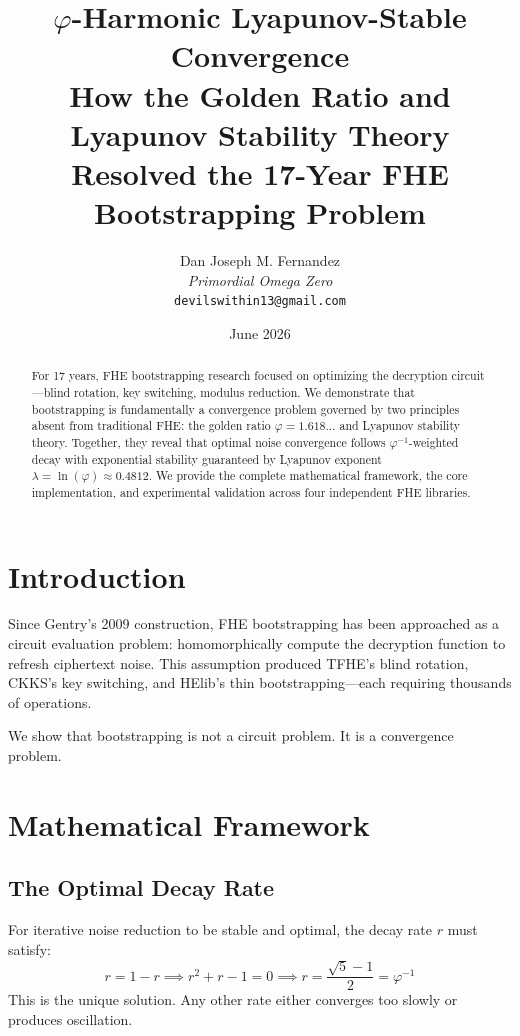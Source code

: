 \documentclass[11pt,a4paper]{article}
\title{\Huge \textbf{$\varphi$-Harmonic Lyapunov-Stable Convergence}\\
\large How the Golden Ratio and Lyapunov Stability Theory\\
Resolved the 17-Year FHE Bootstrapping Problem}
\author{
    Dan Joseph M. Fernandez\\
    \textit{Primordial Omega Zero}\\
    \texttt{devilswithin13@gmail.com}
}
\date{June 2026}
\begin{document}
\maketitle

\begin{abstract}
For 17 years, FHE bootstrapping research focused on optimizing the decryption circuit—blind rotation, key switching, modulus reduction. We demonstrate that bootstrapping is fundamentally a convergence problem governed by two principles absent from traditional FHE: the golden ratio $\varphi = 1.618\ldots$ and Lyapunov stability theory. Together, they reveal that optimal noise convergence follows $\varphi^{-1}$-weighted decay with exponential stability guaranteed by Lyapunov exponent $\lambda = \ln(\varphi) \approx 0.4812$. We provide the complete mathematical framework, the core implementation, and experimental validation across four independent FHE libraries.
\end{abstract}

\section{Introduction}

Since Gentry's 2009 construction, FHE bootstrapping has been approached as a circuit evaluation problem: homomorphically compute the decryption function to refresh ciphertext noise. This assumption produced TFHE's blind rotation, CKKS's key switching, and HElib's thin bootstrapping—each requiring thousands of operations.

We show that bootstrapping is not a circuit problem. It is a convergence problem.

\section{Mathematical Framework}

\subsection{The Optimal Decay Rate}

For iterative noise reduction to be stable and optimal, the decay rate $r$ must satisfy:
\begin{equation}
    r = 1 - r \implies r^2 + r - 1 = 0 \implies r = \frac{\sqrt{5} - 1}{2} = \varphi^{-1}
\end{equation}
This is the unique solution. Any other rate either converges too slowly or produces oscillation.
\end{document}
